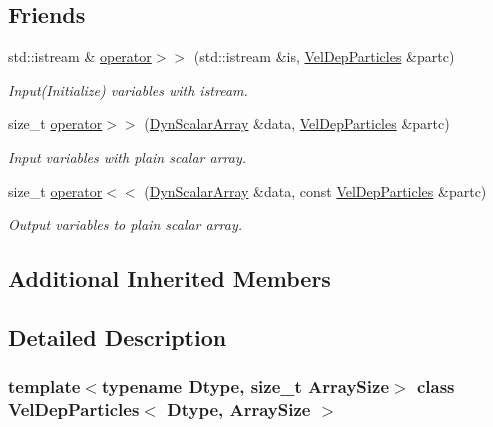 \subsection*{Friends}
\begin{DoxyCompactItemize}
\item 
std\+::istream \& \mbox{\hyperlink{class_vel_dep_particles_a1c8e1f97848175d472220a784c186c6a}{operator$>$$>$}} (std\+::istream \&is, \mbox{\hyperlink{class_vel_dep_particles}{Vel\+Dep\+Particles}} \&partc)
\begin{DoxyCompactList}\small\item\em Input(\+Initialize) variables with istream. \end{DoxyCompactList}\item 
size\+\_\+t \mbox{\hyperlink{class_vel_dep_particles_a42b55c53ca0dd6ae07eb76547847a24b}{operator$>$$>$}} (\mbox{\hyperlink{class_vel_indep_particles_a6bba8ac3f941a144214037a27ccaa119}{Dyn\+Scalar\+Array}} \&data, \mbox{\hyperlink{class_vel_dep_particles}{Vel\+Dep\+Particles}} \&partc)
\begin{DoxyCompactList}\small\item\em Input variables with plain scalar array. \end{DoxyCompactList}\item 
size\+\_\+t \mbox{\hyperlink{class_vel_dep_particles_a0438d6c05ef4fe762fcbb09ced500fd4}{operator$<$$<$}} (\mbox{\hyperlink{class_vel_indep_particles_a6bba8ac3f941a144214037a27ccaa119}{Dyn\+Scalar\+Array}} \&data, const \mbox{\hyperlink{class_vel_dep_particles}{Vel\+Dep\+Particles}} \&partc)
\begin{DoxyCompactList}\small\item\em Output variables to plain scalar array. \end{DoxyCompactList}\end{DoxyCompactItemize}
\subsection*{Additional Inherited Members}


\subsection{Detailed Description}
\subsubsection*{template$<$typename Dtype, size\+\_\+t Array\+Size$>$\newline
class Vel\+Dep\+Particles$<$ Dtype, Array\+Size $>$}

